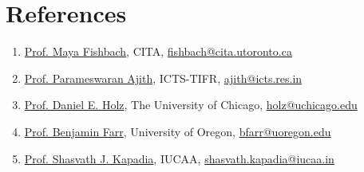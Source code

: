 		
		
		
		
		
		
		
		\section{References}
		\begin{enumerate}[leftmargin=*]
			\item \href{https://mayafishbach.me/}{Prof. Maya Fishbach}, CITA, \href{mailto:fishbach@cita.utoronto.ca}{fishbach@cita.utoronto.ca}
			\item \href{https://www.icts.res.in/people/parameswaran-ajith}{Prof. Parameswaran Ajith}, ICTS-TIFR, \href{mailto:ajith@icts.res.in}{ajith@icts.res.in}
			\item \href{https://physics.uchicago.edu/people/profile/daniel-holz/}{Prof. Daniel E. Holz}, The University of Chicago, \href{mailto:holz@uchicago.edu}{holz@uchicago.edu}
			\item \href{https://cas.uoregon.edu/directory/cas-natural-sciences-faculty/all/bfarr}{Prof. Benjamin Farr}, University of Oregon, \href{mailto:bfarr@uoregon.edu}{bfarr@uoregon.edu}
			\item \href{https://www.iucaa.in/en/faculty-research/shasvath-kapadia}{Prof. Shasvath J. Kapadia}, IUCAA, \href{mailto:shasvath.kapadia@iucaa.in}{shasvath.kapadia@iucaa.in}
		\end{enumerate}
